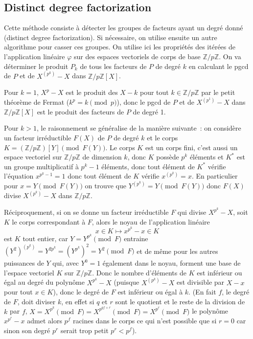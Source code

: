 \documentclass[a4paper,11pt]{book}
\begin{document}
\begin{giacjshere}
\subsection{Distinct degree factorization} 
Cette méthode consiste à détecter les groupes de facteurs
ayant un degré donné (distinct degree factorization). Si nécessaire, 
on utilise ensuite un autre algorithme pour casser ces groupes.
On utilise ici les propriétés des itérées de l'application linéaire 
$\varphi$ sur des espaces vectoriels de corps de base $\mathbb{Z}/p\mathbb{Z}$.
On va déterminer le produit $P_k$ de tous les facteurs de $P$ de degré $k$
en calculant le pgcd de $P$ et de $X^{(p^k)}-X$ dans $\mathbb{Z}/p\mathbb{Z}[X]$.

Pour $k=1$, $X^p-X$ est le produit des $X-k$ pour tout $k\in \mathbb{Z}/p\mathbb{Z}$
par le petit théorème de Fermat ($k^p=k \pmod p$), donc le pgcd
de $P$ et de $X^{(p^1)}-X$ dans $\mathbb{Z}/p\mathbb{Z}[X]$ est le produit des facteurs
de $P$ de degré 1.

Pour $k>1$, le raisonnement se généralise de la manière suivante~: on
considère un facteur irréductible $F(X)$ de $P$ de degré $k$ et le corps
$K=(\mathbb{Z}/p\mathbb{Z})[Y] \pmod{F(Y)}$. Le corps $K$ est un corps fini, c'est
aussi un espace vectoriel sur $\mathbb{Z}/p\mathbb{Z}$ de dimension $k$, donc $K$ possède
$p^k$ éléments et $K^*$ est un groupe multiplicatif à $p^k-1$ éléments,
donc tout élément de $K^*$ vérifie l'équation $x^{p^k-1}=1$ donc
tout élément de $K$ vérifie $x^{(p^k)}=x$. En particulier pour 
$x=Y \pmod {F(Y)}$ 
on trouve que $Y^{(p^k)}=Y \pmod {F(Y)}$ donc $F(X)$ divise $X^{(p^k)}-X$
dans $\mathbb{Z}/p\mathbb{Z}$.

Réciproquement, si on se donne un facteur irréductible $F$ qui divise
$X^{p^k}-X$, soit $K$ le corps correspondant à $F$, 
alors le noyau de l'application linéaire
\[ x \in K \mapsto x^{p^k}-x \in K \]
est $K$ tout entier, car $Y=Y^{p^k} \pmod F$
entraine $(Y^2)^{(p^k)}=Y^{2 p^k}=(Y^{p^k})^2=Y^2 \pmod F$ et de même
pour les autres puissances de $Y$ qui, avec $Y^0=1$ également dans le
noyau, forment une base de l'espace vectoriel $K$ sur $\mathbb{Z}/p\mathbb{Z}$. Donc le
nombre d'éléments de $K$ est inférieur ou égal au degré du polynôme
$X^{p^k}-X$ (puisque $X^{(p^k)}-X$ est divisible par
$X-x$ pour tout $x\in K$),
donc le degré de $F$ est inférieur ou égal à $k$.
(En fait $f$, le degré de $F$, doit diviser $k$, en effet
si $q$ et $r$ sont le quotient et le reste de la division de $k$ par $f$,
$X=X^{p^k} \pmod F =X^{p^{qf+r}} \pmod F=X^{p^r} \pmod F$
le polyn\^ome $x^{p^r}-x$ admet alors $p^f$ racines dans le corps
ce qui n'est possible que si $r=0$ car sinon son degr\'e 
$p^r$ serait trop petit $p^r<p^f$).


\end{giacjshere}
\end{document}
